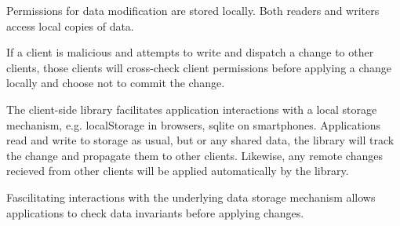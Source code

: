 Permissions for data modification are stored locally. Both readers and writers access local copies of data. 

If a client is malicious and attempts to write and dispatch a change to other clients, those clients will cross-check client permissions before applying a change locally and choose not to commit the change.


The \name{} client-side library facilitates application interactions with a local storage mechanism, e.g. localStorage in browsers, sqlite on smartphones. Applications read and write to storage as usual, but or any shared data, the library will track the change and propagate them to other clients. Likewise, any remote changes recieved from other clients will be applied automatically by the library.

Fascilitating interactions with the underlying data storage mechanism allows \name{} applications to check data invariants before applying changes. 
